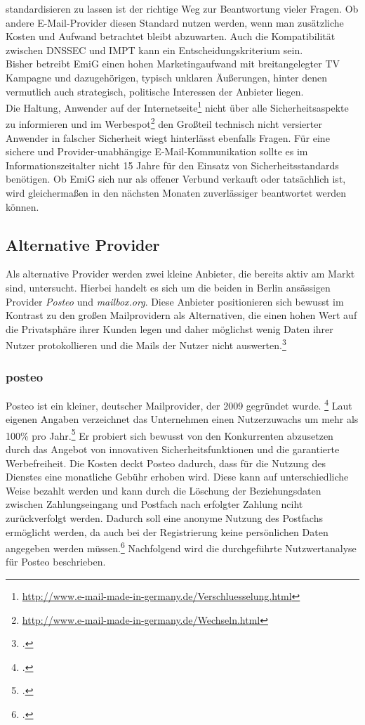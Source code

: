 \documentclass  [paper=a4,
				fontsize=12pt,
				listof=totoc,
				bibliography=totoc
				]{scrreprt}
\begin{document}
			standardisieren zu lassen ist der richtige Weg zur Beantwortung vieler Fragen.
			Ob andere E-Mail-Provider diesen Standard nutzen werden, wenn man zusätzliche Kosten und Aufwand betrachtet bleibt abzuwarten. Auch die Kompatibilität zwischen DNSSEC und IMPT kann ein Entscheidungskriterium sein.
			\medskip\\
			Bisher betreibt EmiG einen hohen Marketingaufwand mit breitangelegter TV Kampagne und dazugehörigen, typisch unklaren Äußerungen, hinter denen vermutlich auch strategisch, politische Interessen der Anbieter liegen.\\
			Die Haltung, Anwender auf der Internetseite\footnote{\url{http://www.e-mail-made-in-germany.de/Verschluesselung.html}} 
			nicht über alle Sicherheitsaspekte zu informieren und im Werbespot\footnote{\url{http://www.e-mail-made-in-germany.de/Wechseln.html}} den Großteil technisch nicht versierter Anwender in falscher Sicherheit wiegt hinterlässt ebenfalls Fragen.
			Für eine sichere und Provider-unabhängige E-Mail-Kommunikation sollte es im Informationszeitalter nicht 15 Jahre für den Einsatz von Sicherheitsstandards benötigen.
			Ob EmiG sich nur als offener Verbund verkauft oder tatsächlich ist, wird gleichermaßen in den nächsten Monaten zuverlässiger beantwortet werden können.

			\subsection{Alternative Provider}
			Als alternative Provider werden zwei kleine Anbieter, die bereits aktiv am Markt sind, untersucht.
			Hierbei handelt es sich um die beiden in Berlin ansässigen Provider \textit{Posteo} und \textit{mailbox.org}.
			Diese Anbieter positionieren sich bewusst im Kontrast zu den großen Mailprovidern als Alternativen, die einen hohen Wert auf die Privatsphäre ihrer Kunden legen und daher möglichst wenig Daten ihrer Nutzer protokollieren und die Mails der Nutzer nicht auswerten.\footcite[Vgl.][]{Posteo2013a, Mailbox2014}
			
			\subsubsection{posteo}
			\label{subsubsec:posteo}
				Posteo ist ein kleiner, deutscher Mailprovider, der 2009 gegründet wurde. \footcite[Vgl.][]{Posteo2013b}
				Laut eigenen Angaben verzeichnet das Unternehmen einen Nutzerzuwachs um mehr als 100\% pro Jahr.\footcite[Vgl.][]{Posteo2013b}
				Er probiert sich bewusst von den Konkurrenten abzusetzen durch das Angebot von innovativen Sicherheitsfunktionen und die garantierte Werbefreiheit.
				Die Kosten deckt Posteo dadurch, dass für die Nutzung des Dienstes eine monatliche Gebühr erhoben wird.
				Diese kann auf unterschiedliche Weise bezahlt werden und kann durch die Löschung der Beziehungsdaten zwischen Zahlungseingang und Postfach nach erfolgter Zahlung nciht zurückverfolgt werden.
				Dadurch soll eine anonyme Nutzung des Postfachs ermöglicht werden, da auch bei der Registrierung keine persönlichen Daten angegeben werden müssen.\footcite[Vgl.][]{Posteo2013a}
				Nachfolgend wird die durchgeführte Nutzwertanalyse für Posteo beschrieben.
				\medskip\\
				
\end{document}

